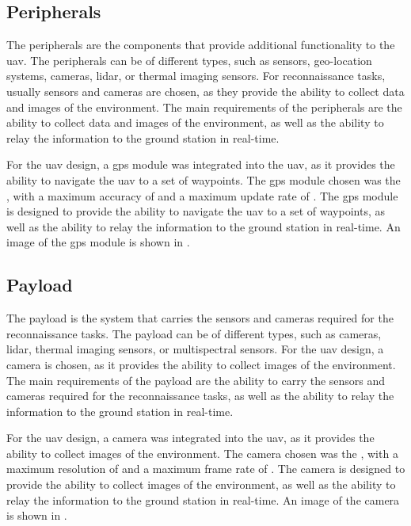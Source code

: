 
\subsection{Peripherals}

The peripherals are the components that provide additional functionality to the \gls{uav}. The peripherals can be of different types, such as sensors, geo-location systems, cameras, lidar, or thermal imaging sensors. For reconnaissance tasks, usually sensors and cameras are chosen, as they provide the ability to collect data and images of the environment. The main requirements of the peripherals are the ability to collect data and images of the environment, as well as the ability to relay the information to the ground station in real-time.

For the \gls{uav} design, a \gls{gps} module was integrated into the \gls{uav}, as it provides the ability to navigate the \gls{uav} to a set of waypoints. The \gls{gps} module chosen was the , with a maximum accuracy of  and a maximum update rate of . The \gls{gps} module is designed to provide the ability to navigate the \gls{uav} to a set of waypoints, as well as the ability to relay the information to the ground station in real-time. An image of the \gls{gps} module is shown in .



\subsection{Payload}

The payload is the system that carries the sensors and cameras required for the reconnaissance tasks. The payload can be of different types, such as cameras, lidar, thermal imaging sensors, or multispectral sensors. For the \gls{uav} design, a camera is chosen, as it provides the ability to collect images of the environment. The main requirements of the payload are the ability to carry the sensors and cameras required for the reconnaissance tasks, as well as the ability to relay the information to the ground station in real-time.

For the \gls{uav} design, a camera was integrated into the \gls{uav}, as it provides the ability to collect images of the environment. The camera chosen was the , with a maximum resolution of  and a maximum frame rate of . The camera is designed to provide the ability to collect images of the environment, as well as the ability to relay the information to the ground station in real-time. An image of the camera is shown in .

